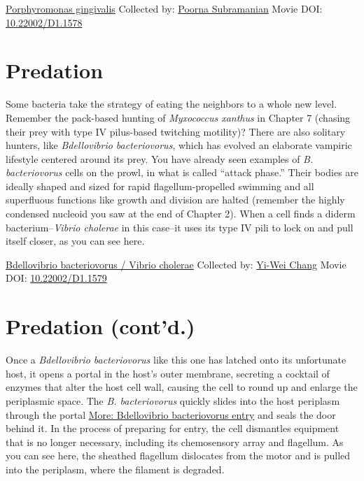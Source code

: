 \documentclass[]{tufte-book}
\begin{document}
\hypertarget{htmlwidget-515bfe82822f5559d13b}{}

\label{fig:9-8}\protect\hyperlink{tree}{Porphyromonas gingivalis} Collected by: \protect\hyperlink{poorna_subramanian}{Poorna Subramanian} Movie DOI: \href{https://doi.org/10.22002/D1.1578}{10.22002/D1.1578}

\hypertarget{predation}{%
\section{Predation}\label{predation}}

Some bacteria take the strategy of eating the neighbors to a whole new level. Remember the pack-based hunting of \emph{Myxococcus xanthus} in Chapter 7 (chasing their prey with type IV pilus-based twitching motility)? There are also solitary hunters, like \emph{Bdellovibrio bacteriovorus}, which has evolved an elaborate vampiric lifestyle centered around its prey. You have already seen examples of \emph{B. bacteriovorus} cells on the prowl, in what is called ``attack phase.'' Their bodies are ideally shaped and sized for rapid flagellum-propelled swimming and all superfluous functions like growth and division are halted (remember the highly condensed nucleoid you saw at the end of Chapter 2). When a cell finds a diderm bacterium--\emph{Vibrio cholerae} in this case--it uses its type IV pili to lock on and pull itself closer, as you can see here.



\hypertarget{htmlwidget-4440a216e163a87cface}{}

\label{fig:9-9}\protect\hyperlink{tree}{Bdellovibrio bacteriovorus / Vibrio cholerae} Collected by: \protect\hyperlink{yi-wei_chang}{Yi-Wei Chang} Movie DOI: \href{https://doi.org/10.22002/D1.1579}{10.22002/D1.1579}

\hypertarget{predation-contd.}{%
\section{Predation (cont'd.)}\label{predation-contd.}}

Once a \emph{Bdellovibrio bacteriovorus} like this one has latched onto its unfortunate host, it opens a portal in the host's outer membrane, secreting a cocktail of enzymes that alter the host cell wall, causing the cell to round up and enlarge the periplasmic space. The \emph{B. bacteriovorus} quickly slides into the host periplasm through the portal \protect\hyperlink{Bdellovibrio_bacteriovorus_entry}{More: Bdellovibrio bacteriovorus entry} and seals the door behind it. In the process of preparing for entry, the cell dismantles equipment that is no longer necessary, including its chemosensory array and flagellum. As you can see here, the sheathed flagellum dislocates from the motor and is pulled into the periplasm, where the filament is degraded.
\end{document}

